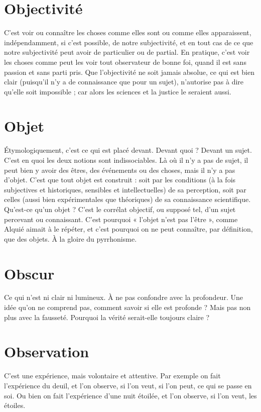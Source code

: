 \section{Objectivité}
C’est voir ou connaître les choses comme elles sont ou comme
elles apparaissent, indépendamment, si c’est possible, de
notre subjectivité, et en tout cas de ce que notre subjectivité peut avoir de particulier
ou de partial. En pratique, c’est voir les choses comme peut les voir tout
observateur de bonne foi, quand il est sans passion et sans parti pris. Que
l’objectivité ne soit jamais absolue, ce qui est bien clair (puisqu'il n’y a de
connaissance que pour un sujet), n'autorise pas à dire qu’elle soit impossible ;
car alors les sciences et la justice le seraient aussi.

\section{Objet}
Étymologiquement, c’est ce qui est placé devant. Devant quoi ?
Devant un sujet. C’est en quoi les deux notions sont indissociables.
Là où il n’y a pas de sujet, il peut bien y avoir des êtres, des événements ou des
choses, mais il n’y a pas d'objet. C’est que tout objet est construit : soit par les
conditions (à la fois subjectives et historiques, sensibles et intellectuelles) de sa
perception, soit par celles (aussi bien expérimentales que théoriques) de sa
connaissance scientifique. Qu’est-ce qu’un objet ? C’est le corrélat objectif, ou
supposé tel, d’un sujet percevant ou connaissant. C’est pourquoi « l'objet n’est
pas l'être », comme Alquié aimait à le répéter, et c’est pourquoi on ne peut
connaître, par définition, que des objets. À la gloire du pyrrhonisme.

\section{Obscur}
Ce qui n’est ni clair ni lumineux. À ne pas confondre avec la profondeur.
Une idée qu’on ne comprend pas, comment savoir si elle
est profonde ? Mais pas non plus avec la fausseté. Pourquoi la vérité serait-elle
toujours claire ?

\section{Observation}
C’est une expérience, mais volontaire et attentive. Par
exemple on fait l’expérience du deuil, et l’on observe, si
l’on veut, si l’on peut, ce qui se passe en soi. Ou bien on fait l’expérience d’une
nuit étoilée, et l’on observe, si l’on veut, les étoiles.

